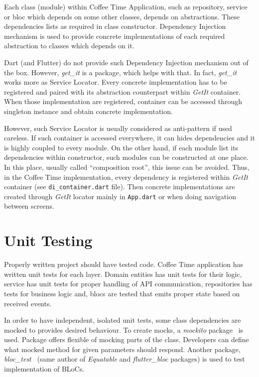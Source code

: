Each class (module) within Coffee Time Application, such as repository, service or \gls{bloc} which depends on some other classes, depends on abstractions. These dependencies lists as required in class constructor. Dependency Injection mechanism is used to provide concrete implementations of each required abstraction to classes which depends on it. 

Dart (and Flutter) do not provide such Dependency Injection mechanism out of the box. However, \textit{get\_it} is a package, which helps with that. In fact, \textit{get\_it} works more as Service Locator. Every concrete implementation has to be registered and paired with its abstraction counterpart within \textit{GetIt} container. When those implementation are registered, container can be accessed through singleton instance and obtain concrete implementation.

However, such Service Locator is usually considered as anti-pattern if used careless. If such container is accessed everywhere, it can hides dependencies and it is highly coupled to every module. On the other hand, if each module list its dependencies within constructor, such modules can be constructed at one place. In this place, usually called ``composition root'', this issue can be avoided. Thus, in the Coffee Time implementation, every dependency is registered within \textit{GetIt} container (see \verb|di_container.dart| file). Then concrete implementations are created through \textit{GetIt} locator mainly in \verb|App.dart| or when doing navigation between screens. 

\section{Unit Testing}
Properly written project should have tested code. Coffee Time application has written unit tests for each layer. Domain entities has unit tests for their logic, service has unit tests for proper handling of API communication, repositories has tests for business logic and, \gls{bloc}s are tested that emits proper state based on received events. 

In order to have independent, isolated unit tests, some class dependencies are mocked to provides desired behaviour. To create mocks, a \textit{mockito} package~\cite{package-mockito} is used. Package offers flexible of mocking parts of the class. Developers can define what mocked method for given parameters should respond. Another package, \textit{bloc\_test}~\cite{package-bloctest} (same author of \textit{Equatable} and \textit{flutter\_bloc} packages) is used to test implementation of BLoCs. 

